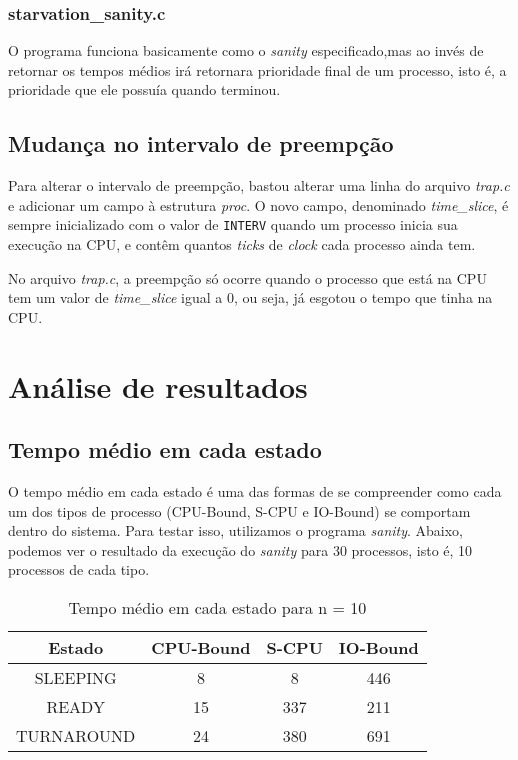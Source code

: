 \documentclass{article}
\begin{document}
\subsubsection{starvation\_sanity.c}

O programa funciona basicamente como o \textit{sanity} especificado,mas ao
invés de retornar os tempos médios irá retornara prioridade final de um
processo, isto é, a prioridade que ele possuía quando terminou.

\subsection{Mudança no intervalo de preempção}

Para alterar o intervalo de preempção, bastou alterar uma linha do arquivo
\textit{trap.c} e adicionar um campo à estrutura \textit{proc}. O novo campo,
denominado \textit{time\_slice}, é sempre inicializado com o valor de
\texttt{INTERV} quando um processo inicia sua execução na CPU, e contêm quantos
\textit{ticks} de \textit{clock} cada processo ainda tem.

No arquivo \textit{trap.c}, a preempção só ocorre quando o processo que está na
CPU tem um valor de \textit{time\_slice} igual a 0, ou seja, já esgotou o tempo
que tinha na CPU.

\section{Análise de resultados}

\subsection{Tempo médio em cada estado}

O tempo médio em cada estado é uma das formas de se compreender como cada um
dos tipos de processo (CPU-Bound, S-CPU e IO-Bound) se comportam dentro do
sistema. Para testar isso, utilizamos o programa \textit{sanity}. Abaixo,
podemos ver o resultado da execução do \textit{sanity} para 30 processos, isto
é, 10 processos de cada tipo.

\begin{table}[H]
      \centering
      \begin{tabular}{|c|c|c|c|}
            \hline
            Estado     & CPU-Bound & S-CPU & IO-Bound
            \\
            \hline
            SLEEPING   & 8         & 8     & 446      \\
            READY      & 15        & 337   & 211      \\
            TURNAROUND & 24        & 380   & 691      \\
            \hline
      \end{tabular}
      \caption{Tempo médio em cada estado para n = 10}
\end{table}
\end{document}
